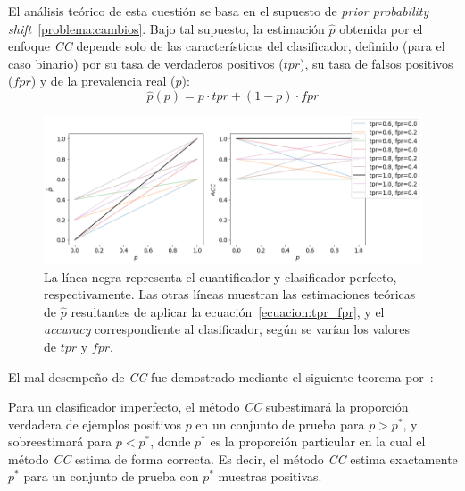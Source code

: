 El análisis teórico de esta cuestión se basa en el supuesto de {\it prior
probability shift\/}~\ref{problema:cambios}. Bajo tal supuesto, la estimación
$\hat p$ obtenida por el enfoque {\it CC\/} depende solo de las características
del clasificador, definido (para el caso binario) por su tasa de verdaderos
positivos ($tpr$), su tasa de falsos positivos ($fpr$) y de la prevalencia real
($p$):
\begin{equation}\label{ecuacion:tpr_fpr}
    \hat p(p) = p \cdot {tpr} + (1-p) \cdot {fpr}
\end{equation}
\begin{figure}[H]
    \includegraphics[width=\textwidth]{../plots_teoria/cc_tpr_fpr.png}
    \caption{La línea negra representa el cuantificador y clasificador perfecto,
    respectivamente. Las otras líneas muestran las estimaciones teóricas de
    $\hat p$ resultantes de aplicar la ecuación~\ref{ecuacion:tpr_fpr}, y el
    {\it accuracy\/} correspondiente al clasificador, según se varían los
    valores de $tpr$ y $fpr$.}\label{fig:cc_tpr_fpr}
\end{figure}

El mal desempeño de {\it CC\/} fue demostrado mediante el siguiente teorema
por~\citet{forman2008quantifying}:

\begin{theorem}
    \citep[p.169]{forman2008quantifying}\label{teorema:forman} Para un
    clasificador imperfecto, el método {\it CC\/} subestimará la proporción
    verdadera de ejemplos positivos $p$ en un conjunto de prueba para $p>p^*$, y
    sobreestimará para $p<p^*$, donde $p^*$ es la proporción particular en la
    cual el método {\it CC\/} estima de forma correcta. Es decir, el método {\it
    CC\/} estima exactamente $p^*$ para un conjunto de prueba con $p^*$ muestras
    positivas.
\end{theorem}

